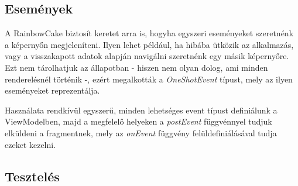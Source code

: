 \subsection{Események}
A RainbowCake biztosít keretet arra is, hogyha egyszeri eseményeket szeretnénk a képernyőn megjeleníteni. Ilyen lehet például, ha hibába ütközik az alkalmazás, vagy a visszakapott adatok alapján navigálni szeretnénk egy másik képernyőre. Ezt nem tárolhatjuk az állapotban - hiszen nem olyan dolog, ami minden renderelésnél történik -, ezért megalkották a \emph{OneShotEvent} típust, mely az ilyen eseményeket reprezentálja. \cite{Events}

Használata rendkívül egyszerű, minden lehetséges event típust definiálunk a ViewModelben, majd a megfelelő helyeken a \emph{postEvent} függvénnyel tudjuk elküldeni a fragmentnek, mely az \emph{onEvent} függvény felüldefiniálásával tudja ezeket kezelni. 

\subsection{Tesztelés}

